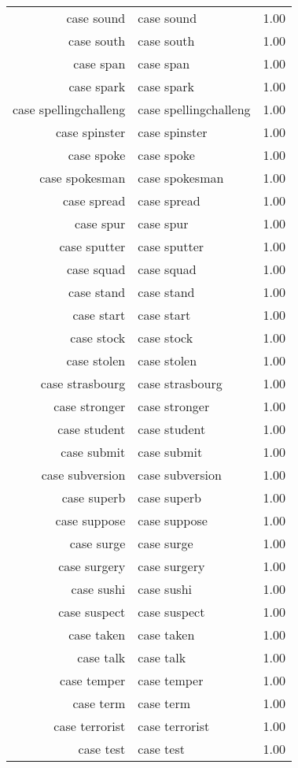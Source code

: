 \begin{table}[ht]
\begin{tabular}{rlr}
  case sound & case sound & 1.00 \\ 
  case south & case south & 1.00 \\ 
  case span & case span & 1.00 \\ 
  case spark & case spark & 1.00 \\ 
  case spellingchalleng & case spellingchalleng & 1.00 \\ 
  case spinster & case spinster & 1.00 \\ 
  case spoke & case spoke & 1.00 \\ 
  case spokesman & case spokesman & 1.00 \\ 
  case spread & case spread & 1.00 \\ 
  case spur & case spur & 1.00 \\ 
  case sputter & case sputter & 1.00 \\ 
  case squad & case squad & 1.00 \\ 
  case stand & case stand & 1.00 \\ 
  case start & case start & 1.00 \\ 
  case stock & case stock & 1.00 \\ 
  case stolen & case stolen & 1.00 \\ 
  case strasbourg & case strasbourg & 1.00 \\ 
  case stronger & case stronger & 1.00 \\ 
  case student & case student & 1.00 \\ 
  case submit & case submit & 1.00 \\ 
  case subversion & case subversion & 1.00 \\ 
  case superb & case superb & 1.00 \\ 
  case suppose & case suppose & 1.00 \\ 
  case surge & case surge & 1.00 \\ 
  case surgery & case surgery & 1.00 \\ 
  case sushi & case sushi & 1.00 \\ 
  case suspect & case suspect & 1.00 \\ 
  case taken & case taken & 1.00 \\ 
  case talk & case talk & 1.00 \\ 
  case temper & case temper & 1.00 \\ 
  case term & case term & 1.00 \\ 
  case terrorist & case terrorist & 1.00 \\ 
  case test & case test & 1.00 \\ 

\end{tabular}
\end{table}
